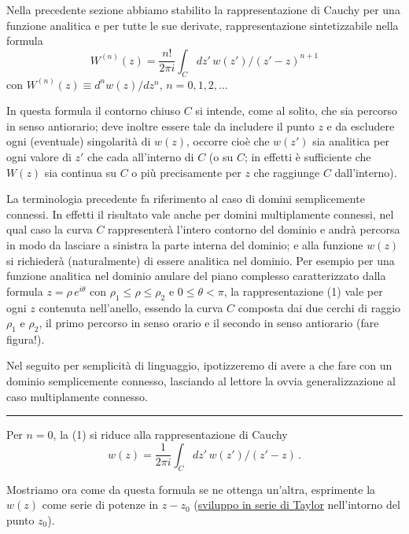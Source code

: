 \documentclass[11pt, a4paper]{book}
\numberwithin{equation}{section}
\begin{document}
Nella precedente sezione abbiamo stabilito la rappresentazione di Cauchy per una funzione analitica e per tutte le sue derivate, rappresentazione sintetizzabile nella formula
\begin{equation}
W^{(n)}(z) = \frac{n!}{2\pi i} \int_C dz'\, w(z') / (z'-z)^{n+1} \tag{1}
\end{equation}
con $W^{(n)}(z) \equiv d^n w(z)/dz^n$, $n = 0, 1, 2, \ldots$

In questa formula il contorno chiuso $C$ si intende, come al solito, che sia percorso in senso antiorario; deve inoltre essere tale da includere il punto $z$ e da escludere ogni (eventuale) singolarità di $w(z)$, occorre cioè che $w(z')$ sia analitica per ogni valore di $z'$ che cada all'interno di $C$ (o su $C$; in effetti è sufficiente che $W(z)$ sia continua su $C$ o più precisamente per $z$ che raggiunge $C$ dall'interno).

\medskip

La terminologia precedente fa riferimento al caso di domini semplicemente connessi. In effetti il risultato vale anche per domini multiplamente connessi, nel qual caso la curva $C$ rappresenterà l'intero contorno del dominio e andrà percorsa in modo da lasciare a sinistra la parte interna del dominio; e alla funzione $w(z)$ si richiederà (naturalmente) di essere analitica nel dominio. Per esempio per una funzione analitica nel dominio anulare del piano complesso caratterizzato dalla formula $z = \rho\, e^{i\theta}$ con $\rho_1 \leq \rho \leq \rho_2$ e $0 \leq \theta < \pi$, la rappresentazione (1) vale per ogni $z$ contenuta nell'anello, essendo la curva $C$ composta dai due cerchi di raggio $\rho_1$ e $\rho_2$, il primo percorso in senso orario e il secondo in senso antiorario (fare figura!).

Nel seguito per semplicità di linguaggio, ipotizzeremo di avere a che fare con un dominio semplicemente connesso, lasciando al lettore la ovvia generalizzazione al caso multiplamente connesso.

\medskip\hrule\medskip

Per $n=0$, la (1) si riduce alla rappresentazione di Cauchy
\begin{equation}
w(z) = \frac{1}{2\pi i} \int_C dz'\, w(z') / (z'-z)\,. \tag{2}
\end{equation}

Mostriamo ora come da questa formula se ne ottenga un'altra, esprimente la $w(z)$ come serie di potenze in $z-z_0$ (\uline{sviluppo in serie di Taylor} nell'intorno del punto $z_0$).
\end{document}
